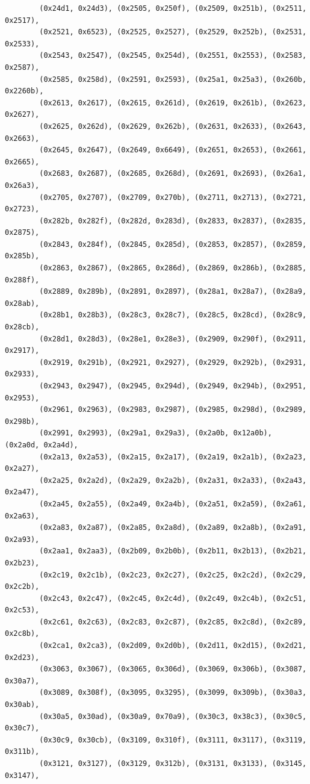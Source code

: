\documentclass[11pt,a4paper]{article}
\begin{document}
\begin{lstlisting}
        (0x24d1, 0x24d3), (0x2505, 0x250f), (0x2509, 0x251b), (0x2511, 0x2517),
        (0x2521, 0x6523), (0x2525, 0x2527), (0x2529, 0x252b), (0x2531, 0x2533),
        (0x2543, 0x2547), (0x2545, 0x254d), (0x2551, 0x2553), (0x2583, 0x2587),
        (0x2585, 0x258d), (0x2591, 0x2593), (0x25a1, 0x25a3), (0x260b, 0x2260b),
        (0x2613, 0x2617), (0x2615, 0x261d), (0x2619, 0x261b), (0x2623, 0x2627),
        (0x2625, 0x262d), (0x2629, 0x262b), (0x2631, 0x2633), (0x2643, 0x2663),
        (0x2645, 0x2647), (0x2649, 0x6649), (0x2651, 0x2653), (0x2661, 0x2665),
        (0x2683, 0x2687), (0x2685, 0x268d), (0x2691, 0x2693), (0x26a1, 0x26a3),
        (0x2705, 0x2707), (0x2709, 0x270b), (0x2711, 0x2713), (0x2721, 0x2723),
        (0x282b, 0x282f), (0x282d, 0x283d), (0x2833, 0x2837), (0x2835, 0x2875),
        (0x2843, 0x284f), (0x2845, 0x285d), (0x2853, 0x2857), (0x2859, 0x285b),
        (0x2863, 0x2867), (0x2865, 0x286d), (0x2869, 0x286b), (0x2885, 0x288f),
        (0x2889, 0x289b), (0x2891, 0x2897), (0x28a1, 0x28a7), (0x28a9, 0x28ab),
        (0x28b1, 0x28b3), (0x28c3, 0x28c7), (0x28c5, 0x28cd), (0x28c9, 0x28cb),
        (0x28d1, 0x28d3), (0x28e1, 0x28e3), (0x2909, 0x290f), (0x2911, 0x2917),
        (0x2919, 0x291b), (0x2921, 0x2927), (0x2929, 0x292b), (0x2931, 0x2933),
        (0x2943, 0x2947), (0x2945, 0x294d), (0x2949, 0x294b), (0x2951, 0x2953),
        (0x2961, 0x2963), (0x2983, 0x2987), (0x2985, 0x298d), (0x2989, 0x298b),
        (0x2991, 0x2993), (0x29a1, 0x29a3), (0x2a0b, 0x12a0b), (0x2a0d, 0x2a4d),
        (0x2a13, 0x2a53), (0x2a15, 0x2a17), (0x2a19, 0x2a1b), (0x2a23, 0x2a27),
        (0x2a25, 0x2a2d), (0x2a29, 0x2a2b), (0x2a31, 0x2a33), (0x2a43, 0x2a47),
        (0x2a45, 0x2a55), (0x2a49, 0x2a4b), (0x2a51, 0x2a59), (0x2a61, 0x2a63),
        (0x2a83, 0x2a87), (0x2a85, 0x2a8d), (0x2a89, 0x2a8b), (0x2a91, 0x2a93),
        (0x2aa1, 0x2aa3), (0x2b09, 0x2b0b), (0x2b11, 0x2b13), (0x2b21, 0x2b23),
        (0x2c19, 0x2c1b), (0x2c23, 0x2c27), (0x2c25, 0x2c2d), (0x2c29, 0x2c2b),
        (0x2c43, 0x2c47), (0x2c45, 0x2c4d), (0x2c49, 0x2c4b), (0x2c51, 0x2c53),
        (0x2c61, 0x2c63), (0x2c83, 0x2c87), (0x2c85, 0x2c8d), (0x2c89, 0x2c8b),
        (0x2ca1, 0x2ca3), (0x2d09, 0x2d0b), (0x2d11, 0x2d15), (0x2d21, 0x2d23),
        (0x3063, 0x3067), (0x3065, 0x306d), (0x3069, 0x306b), (0x3087, 0x30a7),
        (0x3089, 0x308f), (0x3095, 0x3295), (0x3099, 0x309b), (0x30a3, 0x30ab),
        (0x30a5, 0x30ad), (0x30a9, 0x70a9), (0x30c3, 0x38c3), (0x30c5, 0x30c7),
        (0x30c9, 0x30cb), (0x3109, 0x310f), (0x3111, 0x3117), (0x3119, 0x311b),
        (0x3121, 0x3127), (0x3129, 0x312b), (0x3131, 0x3133), (0x3145, 0x3147),

\end{lstlisting}
\end{document}
